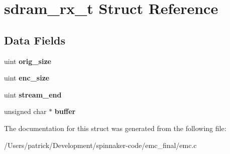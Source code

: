 \hypertarget{structsdram__rx__t}{}\section{sdram\+\_\+rx\+\_\+t Struct Reference}
\label{structsdram__rx__t}
\subsection*{Data Fields}
\begin{DoxyCompactItemize}
\item 
uint {\bfseries orig\+\_\+size}\hypertarget{structsdram__rx__t_a885e0213af411fa5d53ec83d1af18cbb}{}\label{structsdram__rx__t_a885e0213af411fa5d53ec83d1af18cbb}

\item 
uint {\bfseries enc\+\_\+size}\hypertarget{structsdram__rx__t_a9e6fe673b6d2bda0758dbb2f74f58576}{}\label{structsdram__rx__t_a9e6fe673b6d2bda0758dbb2f74f58576}

\item 
uint {\bfseries stream\+\_\+end}\hypertarget{structsdram__rx__t_a90d5a3bd3f45df2eb837957e10f42af8}{}\label{structsdram__rx__t_a90d5a3bd3f45df2eb837957e10f42af8}

\item 
unsigned char $\ast$ {\bfseries buffer}\hypertarget{structsdram__rx__t_a70e7ad2e1a45c8db5fba9ad4778bd400}{}\label{structsdram__rx__t_a70e7ad2e1a45c8db5fba9ad4778bd400}

\end{DoxyCompactItemize}


The documentation for this struct was generated from the following file\+:\begin{DoxyCompactItemize}
\item 
/\+Users/patrick/\+Development/spinnaker-\/code/emc\+\_\+final/emc.\+c\end{DoxyCompactItemize}
